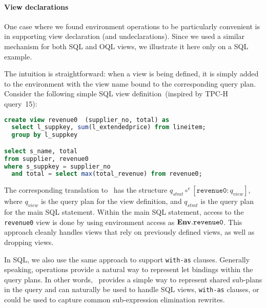 \paragraph*{View declarations}

One case where we found environment operations to be particularly
convenient is in supporting view declaration (and
undeclarations). Since we used a similar mechanism for both SQL and
OQL views, we illustrate it here only on a SQL example.

The intuition is straightforward: when a view is being defined, it is
simply added to the environment with the view name bound to the
corresponding query plan. Consider the following simple SQL view
definition~(inspired by TPC-H query~15):

\begin{lstlisting}[language=sql]
create view revenue0  (supplier_no, total) as
  select l_suppkey, sum(l_extendedprice) from lineitem;
  group by l_suppkey

select s_name, total
from supplier, revenue0
where s_suppkey = supplier_no
  and total = select max(total_revenue) from revenue0;
\end{lstlisting}

The corresponding translation to \NRAEnv\ has the structure $ q_{stmt}
\circ^e [\mathtt{revenue0} : q_{view}]$, where $q_{view}$ is the query
plan for the view definition, and $q_{stmt}$ is the query plan for the
main SQL statement. Within the main SQL statement, access to the
\texttt{revenue0} view is done by using environment access as
$\textup{\textbf{{Env}}}.\mathtt{revenue0}$. This approach cleanly handles views that
rely on previously defined views, as well as dropping views.

In SQL, we also use the same approach to support \texttt{with-as}
clauses. Generally speaking, \NRAEnv operations provide a natural way
to represent let bindings within the query plans. In other words,
\NRAEnv\ provides a simple way to represent shared sub-plans in the
query and can naturally be used to handle SQL views, \texttt{with-as}
clauses, or could be used to capture common sub-expression elimination
rewrites.

